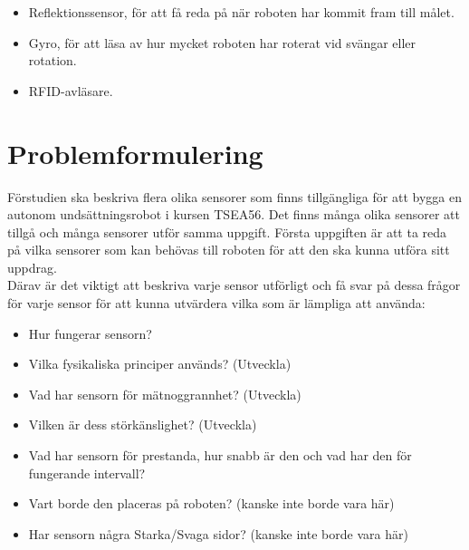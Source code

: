 \documentclass[11pt]{article}
\begin{document}
\begin{flushleft}
\begin{itemize}
\item Reflektionssensor, för att få reda på när roboten har kommit fram till målet.

\item Gyro, för att läsa av hur mycket roboten har roterat vid svängar eller rotation.

\item RFID-avläsare.

\end{itemize}


\pagebreak


\section{Problemformulering}
Förstudien ska beskriva flera olika sensorer som finns tillgängliga för att bygga en autonom undsättningsrobot i kursen TSEA56. Det finns många olika sensorer att tillgå och många sensorer utför samma uppgift. Första uppgiften är att ta reda på vilka sensorer som kan behövas till roboten för att den ska kunna utföra sitt uppdrag.
\\[0.1in]
Därav är det viktigt att beskriva varje sensor utförligt och få svar på dessa frågor för varje sensor för att kunna utvärdera vilka som är lämpliga att använda: 
\\[0.1in]

\begin{itemize}

\item Hur fungerar sensorn?

\item Vilka fysikaliska principer används? (Utveckla)

\item Vad har sensorn för mätnoggrannhet? (Utveckla)

\item Vilken är dess störkänslighet? (Utveckla)

\item Vad har sensorn för prestanda, hur snabb är den och vad har den för fungerande intervall?

\item Vart borde den placeras på roboten? (kanske inte borde vara här)

\item Har sensorn några Starka/Svaga sidor? (kanske inte borde vara här)


\end{itemize}
\end{flushleft}
\end{document}
